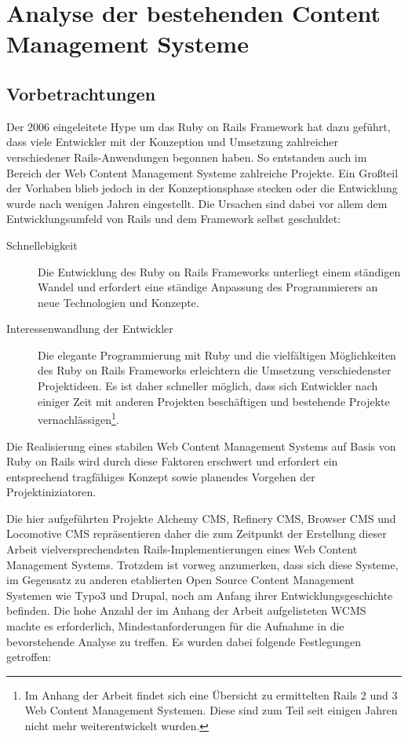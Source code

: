 \chapter{Analyse der bestehenden Content Management Systeme}



\section{Vorbetrachtungen}
Der 2006 eingeleitete Hype um das Ruby on Rails Framework hat dazu geführt, dass viele Entwickler mit der Konzeption und Umsetzung zahlreicher verschiedener Rails-Anwendungen begonnen haben. So entstanden auch im Bereich der Web Content Management Systeme zahlreiche Projekte. Ein Großteil der Vorhaben blieb jedoch in der Konzeptionsphase stecken oder die Entwicklung wurde nach wenigen Jahren eingestellt. Die Ursachen sind dabei vor allem dem Entwicklungsumfeld von Rails und dem Framework selbst geschuldet:


\begin{description}
\item[Schnellebigkeit]
Die Entwicklung des Ruby on Rails Frameworks unterliegt einem ständigen Wandel und erfordert eine ständige Anpassung des Programmierers an neue Technologien und Konzepte.
\item[Interessenwandlung der Entwickler] Die elegante Programmierung mit Ruby und die vielfältigen Möglichkeiten des Ruby on Rails Frameworks erleichtern die Umsetzung verschiedenster Projektideen.
Es ist daher schneller möglich, dass sich Entwickler nach einiger Zeit mit anderen Projekten beschäftigen und bestehende Projekte vernachlässigen\footnote{Im Anhang der Arbeit findet sich eine Übersicht zu ermittelten Rails 2 und 3 Web Content Management Systemen. Diese sind zum Teil seit einigen Jahren nicht mehr weiterentwickelt wurden.}.
\end{description}

Die Realisierung eines stabilen Web Content Management Systems auf Basis von Ruby on Rails wird durch diese Faktoren erschwert und erfordert ein entsprechend tragfähiges Konzept sowie planendes Vorgehen der Projektiniziatoren.

Die hier aufgeführten Projekte Alchemy CMS, Refinery CMS, Browser CMS und Locomotive CMS repräsentieren daher die zum Zeitpunkt der Erstellung dieser Arbeit vielversprechendsten Rails-Implementierungen eines Web Content Management Systems. Trotzdem ist vorweg anzumerken, dass sich diese Systeme, im Gegensatz zu anderen etablierten Open Source Content Management Systemen wie Typo3 und Drupal, noch am Anfang ihrer Entwicklungsgeschichte befinden.
\newline
\newline
Die hohe Anzahl der im Anhang der Arbeit aufgelisteten WCMS machte es erforderlich, Mindestanforderungen für die Aufnahme in die bevorstehende Analyse zu treffen. Es wurden dabei folgende Festlegungen getroffen:

